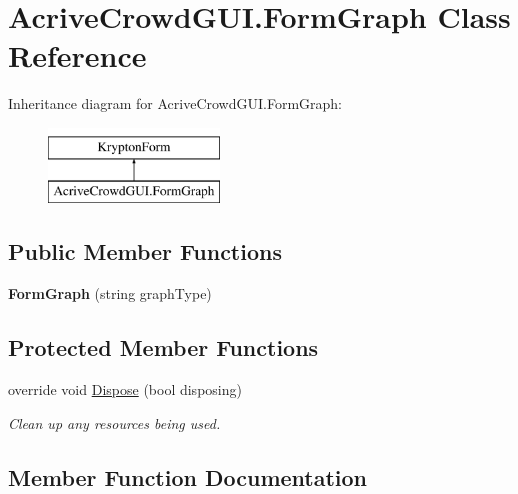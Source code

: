 \hypertarget{class_acrive_crowd_g_u_i_1_1_form_graph}{}\section{Acrive\+Crowd\+G\+U\+I.\+Form\+Graph Class Reference}
\label{class_acrive_crowd_g_u_i_1_1_form_graph}
Inheritance diagram for Acrive\+Crowd\+G\+U\+I.\+Form\+Graph\+:\begin{figure}[H]
\begin{center}
\leavevmode
\includegraphics[height=2.000000cm]{class_acrive_crowd_g_u_i_1_1_form_graph}
\end{center}
\end{figure}
\subsection*{Public Member Functions}
\begin{DoxyCompactItemize}
\item 
\hypertarget{class_acrive_crowd_g_u_i_1_1_form_graph_a46436b9802063996dcd6ad4bcb1815f8}{}{\bfseries Form\+Graph} (string graph\+Type)\label{class_acrive_crowd_g_u_i_1_1_form_graph_a46436b9802063996dcd6ad4bcb1815f8}

\end{DoxyCompactItemize}
\subsection*{Protected Member Functions}
\begin{DoxyCompactItemize}
\item 
override void \hyperlink{class_acrive_crowd_g_u_i_1_1_form_graph_a7f915c9c30c178b1e08b97b4dc0a2c39}{Dispose} (bool disposing)
\begin{DoxyCompactList}\small\item\em Clean up any resources being used. \end{DoxyCompactList}\end{DoxyCompactItemize}


\subsection{Member Function Documentation}
\hypertarget{class_acrive_crowd_g_u_i_1_1_form_graph_a7f915c9c30c178b1e08b97b4dc0a2c39}{}
